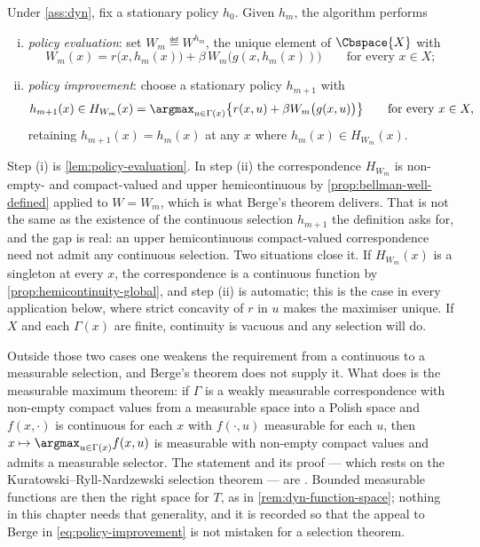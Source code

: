 \begin{definition}\label{def:policy-iteration}
	Under \autoref{ass:dyn}, fix a stationary policy $h_0$. Given $h_m$, the
	algorithm performs
	\begin{enumerate}[(i)]
		\item \emph{policy evaluation}: set $W_m\eqdef W^{h_m}$, the unique element
		      of $\Cbspace{X}$ with
		      \begin{equation}\label{eq:policy-evaluation}
			      W_m(x)=r\bigl(x,h_m(x)\bigr)+\beta\,W_m\bigl(g(x,h_m(x))\bigr)
			      \qquad\text{for every }x\in X;
		      \end{equation}
		\item \emph{policy improvement}: choose a stationary policy $h_{m+1}$ with
		      \begin{equation}\label{eq:policy-improvement}
			      h_{m+1}(x)\in H_{W_m}(x)=\argmax_{u\in\Gamma(x)}
			      \bigl\{r(x,u)+\beta W_m\bigl(g(x,u)\bigr)\bigr\}
			      \qquad\text{for every }x\in X,
		      \end{equation}
		      retaining $h_{m+1}(x)=h_m(x)$ at any $x$ where $h_m(x)\in H_{W_m}(x)$.
	\end{enumerate}
\end{definition}

Step (i) is \autoref{lem:policy-evaluation}. In step (ii) the correspondence
$H_{W_m}$ is non-empty- and compact-valued and upper hemicontinuous by
\autoref{prop:bellman-well-defined} applied to $W=W_m$, which is what Berge's
theorem delivers. That is not the same as the existence of the continuous
selection $h_{m+1}$ the definition asks for, and the gap is real: an upper
hemicontinuous compact-valued correspondence need not admit any continuous
selection. Two situations close it. If $H_{W_m}(x)$ is a singleton at every $x$,
the correspondence is a continuous function by
\autoref{prop:hemicontinuity-global}, and step (ii) is automatic; this is the
case in every application below, where strict concavity of $r$ in $u$ makes the
maximiser unique. If $X$ and each $\Gamma(x)$ are finite, continuity is vacuous
and any selection will do.

\begin{remark}\label{rem:measurable-selection}
	Outside those two cases one weakens the requirement from a continuous to a
	measurable selection, and Berge's theorem does not supply it. What does is
	the measurable maximum theorem: if $\Gamma$ is a weakly measurable
	correspondence with non-empty compact values from a measurable space into a
	Polish space and $f(x,\cdot)$ is continuous for each $x$ with $f(\cdot,u)$
	measurable for each $u$, then $x\mapsto\argmax_{u\in\Gamma(x)}f(x,u)$ is
	measurable with non-empty compact values and admits a measurable selector.
	The statement and its proof --- which rests on the
	Kuratowski--Ryll-Nardzewski selection theorem --- are
	\textcite[Thm.~18.19]{aliprantis2006infinite}. Bounded measurable functions
	are then the right space for $T$, as in
	\autoref{rem:dyn-function-space}; nothing in this chapter needs that
	generality, and it is recorded so that the appeal to Berge in
	\eqref{eq:policy-improvement} is not mistaken for a selection theorem.
\end{remark}

